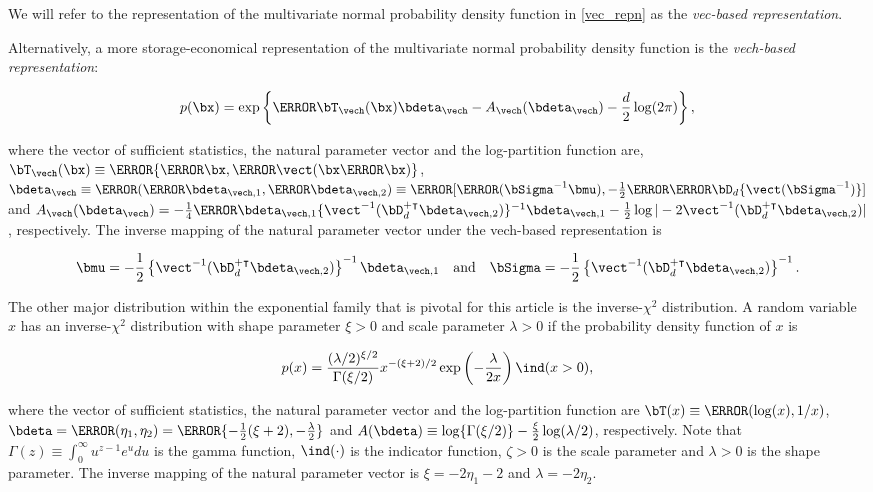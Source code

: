 \documentclass[12pt]{article}
\theoremstyle{plain}
\theoremstyle{definition}
\theoremstyle{remark}
\begin{document}
\noindent We will refer to the representation of the multivariate normal probability density function in
\eqref{vec_repn} as the \emph{vec-based representation}.

Alternatively, a more storage-economical
representation of the multivariate normal probability density function is the \emph{vech-based representation}:

\[
	p (\bx) = \exp \left\{ \T{\bT_{\vech} (\bx)} \bdeta_{\vech} - A_{\vech} (\bdeta_{\vech}) - \frac{d}{2} \log (2 \pi) \right\},
\]

\noindent where the vector of sufficient statistics, the natural parameter vector and the log-partition function are,
$\bT_{\vech} (\bx) \equiv \T{\{ \T{\bx}, \T{\vect ( \bx \T{\bx} )} \}}$,
$\bdeta_{\vech} \equiv \T{( \T{\bdeta_{\vech, 1}}, \T{\bdeta_{\vech, 2}} )} \equiv \T{[ \T{( \bSigma^{-1} \bmu )},
-\frac12 \T{ \T{\bD_d} \{ \vect (\bSigma^{-1}) \}} ]}$ and
$A_{\vech} (\bdeta_{\vech}) = -\frac14 \T{\bdeta}_{\vech, 1} \{ \vect^{-1} (\bD_d^{+ \intercal} \bdeta_{\vech, 2}) \}^{-1}
\bdeta_{\vech, 1} - \frac12 \log | -2 \vect^{-1} (\bD_d^{+ \intercal} \bdeta_{\vech, 2}) |$, respectively.
The inverse mapping of the natural parameter vector under the vech-based representation is

\begin{equation}
	\bmu = -\frac12 \left\{ \vect^{-1} (\bD_d^{+ \intercal}\bdeta_{\vech, 2}) \right\}^{-1} \bdeta_{\vech, 1} \quad
	\text{and} \quad
	\bSigma = -\frac12 \left\{ \vect^{-1} (\bD_d^{+ \intercal}\bdeta_{\vech, 2}) \right\}^{-1}.
\label{gauss_vech_comm_params}
\end{equation}

The other major distribution within the exponential family that is pivotal for this article is the inverse-$\chi^2$ distribution.
A random variable $x$ has an inverse-$\chi^2$ distribution with shape parameter $\xi > 0$ and scale parameter
$\lambda > 0$ if the probability density function of $x$ is

\[
	p(x) = 
		\frac{(\lambda/2)^{\xi/2}}{\Gamma (\xi/2)}
		x^{-(\xi + 2)/2} \exp \left( -\frac{\lambda}{2 x} \right) \ind (x > 0),
\]

\noindent where the vector of sufficient statistics, the natural parameter vector and the log-partition function are
$\bT (x) \equiv \T{( \log (x), 1/x )}$, $\bdeta = \T{(\eta_1, \eta_2)} = \T{\{-\frac12 (\xi + 2), -\frac{\lambda}{2} \}}$
and $A(\bdeta) \equiv \log \{ \Gamma (\xi/2) \} - \frac{\xi}{2} \log (\lambda/2)$, respectively. Note that
$\Gamma (z) \equiv \int_0^\infty u^{z - 1} e^u du$ is the gamma function,
$\ind (\cdot)$ is the indicator function, $\zeta > 0$ is the scale parameter and $\lambda > 0$ is the shape parameter.
The inverse mapping of the natural parameter vector is
$\xi = -2 \eta_1 - 2$ and $\lambda = -2 \eta_2$.
\end{document}
